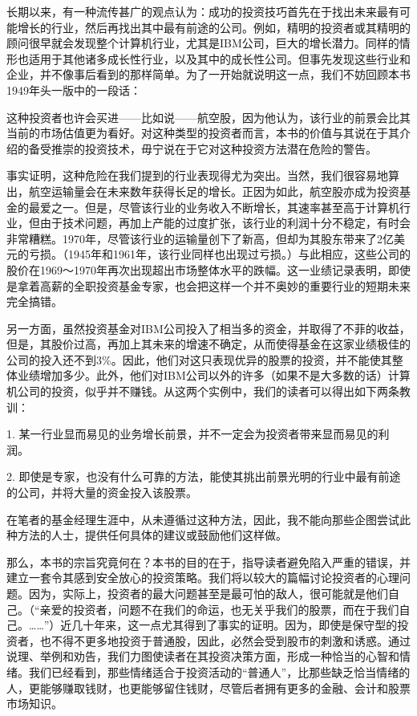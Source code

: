 \documentclass[12pt,oneside]{book}
\begin{document}
长期以来，有一种流传甚广的观点认为：成功的投资技巧首先在于找出未来最有可能增长的行业，然后再找出其中最有前途的公司。例如，精明的投资者或其精明的顾问很早就会发现整个计算机行业，尤其是IBM公司，巨大的增长潜力。同样的情形也适用于其他诸多成长性行业，以及其中的成长性公司。但事先发现这些行业和企业，并不像事后看到的那样简单。为了一开始就说明这一点，我们不妨回顾本书1949年头一版中的一段话：

这种投资者也许会买进——比如说——航空股，因为他认为，该行业的前景会比其当前的市场估值更为看好。对这种类型的投资者而言，本书的价值与其说在于其介绍的备受推崇的投资技术，毋宁说在于它对这种投资方法潜在危险的警告。

事实证明，这种危险在我们提到的行业表现得尤为突出。当然，我们很容易地算出，航空运输量会在未来数年获得长足的增长。正因为如此，航空股亦成为投资基金的最爱之一。但是，尽管该行业的业务收入不断增长，其速率甚至高于计算机行业，但由于技术问题，再加上产能的过度扩张，该行业的利润十分不稳定，有时会非常糟糕。1970年，尽管该行业的运输量创下了新高，但却为其股东带来了2亿美元的亏损。（1945年和1961年，该行业同样也出现过亏损。）与此相应，这些公司的股价在1969～1970年再次出现超出市场整体水平的跌幅。这一业绩记录表明，即使是拿着高薪的全职投资基金专家，也会把这样一个并不奥妙的重要行业的短期未来完全搞错。

另一方面，虽然投资基金对IBM公司投入了相当多的资金，并取得了不菲的收益，但是，其股价过高，再加上其未来的增速不确定，从而使得基金在这家业绩极佳的公司的投入还不到3\%。因此，他们对这只表现优异的股票的投资，并不能使其整体业绩增加多少。此外，他们对IBM公司以外的许多（如果不是大多数的话）计算机公司的投资，似乎并不赚钱。从这两个实例中，我们的读者可以得出如下两条教训：

1. 某一行业显而易见的业务增长前景，并不一定会为投资者带来显而易见的利润。

2. 即使是专家，也没有什么可靠的方法，能使其挑出前景光明的行业中最有前途的公司，并将大量的资金投入该股票。

在笔者的基金经理生涯中，从未遵循过这种方法，因此，我不能向那些企图尝试此种方法的人士，提供任何具体的建议或鼓励他们这样做。

那么，本书的宗旨究竟何在？本书的目的在于，指导读者避免陷入严重的错误，并建立一套令其感到安全放心的投资策略。我们将以较大的篇幅讨论投资者的心理问题。因为，实际上，投资者的最大问题甚至是最可怕的敌人，很可能就是他们自己。（“亲爱的投资者，问题不在我们的命运，也无关乎我们的股票，而在于我们自己。……”）近几十年来，这一点尤其得到了事实的证明。因为，即使是保守型的投资者，也不得不更多地投资于普通股，因此，必然会受到股市的刺激和诱惑。通过说理、举例和劝告，我们力图使读者在其投资决策方面，形成一种恰当的心智和情绪。我们已经看到，那些情绪适合于投资活动的“普通人”，比那些缺乏恰当情绪的人，更能够赚取钱财，也更能够留住钱财，尽管后者拥有更多的金融、会计和股票市场知识。
\end{document}
